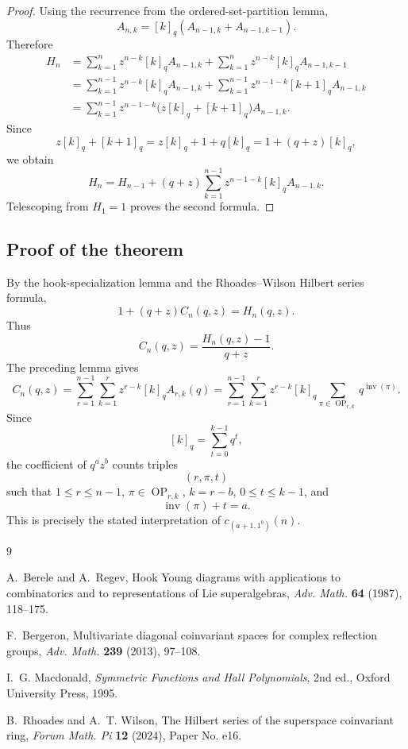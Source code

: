 \documentclass[12pt]{article}
\DeclareMathOperator{\Inv}{inv}
\DeclareMathOperator{\OP}{OP}
\begin{document}
\begin{proof}
Using the recurrence from the ordered-set-partition lemma,
\[
A_{n,k}=[k]_q(A_{n-1,k}+A_{n-1,k-1}).
\]
Therefore
\[
\begin{aligned}
H_n
&=
\sum_{k=1}^{n} z^{n-k}[k]_qA_{n-1,k}
+
\sum_{k=1}^{n} z^{n-k}[k]_qA_{n-1,k-1}  \\
&=
\sum_{k=1}^{n-1} z^{n-k}[k]_qA_{n-1,k}
+
\sum_{k=1}^{n-1} z^{n-1-k}[k+1]_qA_{n-1,k} \\
&=
\sum_{k=1}^{n-1} z^{n-1-k}
\bigl(z[k]_q+[k+1]_q\bigr)A_{n-1,k}.
\end{aligned}
\]
Since
\[
z[k]_q+[k+1]_q
=
z[k]_q+1+q[k]_q
=
1+(q+z)[k]_q,
\]
we obtain
\[
H_n
=
H_{n-1}
+
(q+z)\sum_{k=1}^{n-1} z^{n-1-k}[k]_qA_{n-1,k}.
\]
Telescoping from \(H_1=1\) proves the second formula.
\end{proof}

\subsection{Proof of the theorem}

By the hook-specialization lemma and the Rhoades--Wilson Hilbert series formula,
\[
1+(q+z)C_n(q,z)
=
H_n(q,z).
\]
Thus
\[
C_n(q,z)=\frac{H_n(q,z)-1}{q+z}.
\]
The preceding lemma gives
\[
C_n(q,z)
=
\sum_{r=1}^{n-1}\sum_{k=1}^{r}
z^{r-k}[k]_qA_{r,k}(q)
=
\sum_{r=1}^{n-1}\sum_{k=1}^{r}
z^{r-k}[k]_q
\sum_{\pi\in \OP_{r,k}}q^{\Inv(\pi)}.
\]
Since
\[
[k]_q=\sum_{t=0}^{k-1}q^t,
\]
the coefficient of \(q^a z^b\) counts triples
\[
(r,\pi,t)
\]
such that \(1\leq r\leq n-1\), \(\pi\in \OP_{r,k}\), \(k=r-b\), \(0\leq t\leq k-1\),
and
\[
\Inv(\pi)+t=a.
\]
This is precisely the stated interpretation of \(c_{(a+1,1^b)}(n)\).

\begin{thebibliography}{9}

A.~Berele and A.~Regev,
\newblock Hook Young diagrams with applications to combinatorics and to representations of Lie superalgebras,
\newblock \emph{Adv. Math.} \textbf{64} (1987), 118--175.

F.~Bergeron,
\newblock Multivariate diagonal coinvariant spaces for complex reflection groups,
\newblock \emph{Adv. Math.} \textbf{239} (2013), 97--108.

I.~G. Macdonald,
\newblock \emph{Symmetric Functions and Hall Polynomials},
\newblock 2nd ed., Oxford University Press, 1995.

B.~Rhoades and A.~T. Wilson,
\newblock The Hilbert series of the superspace coinvariant ring,
\newblock \emph{Forum Math. Pi} \textbf{12} (2024), Paper No. e16.

\end{thebibliography}
\end{document}
